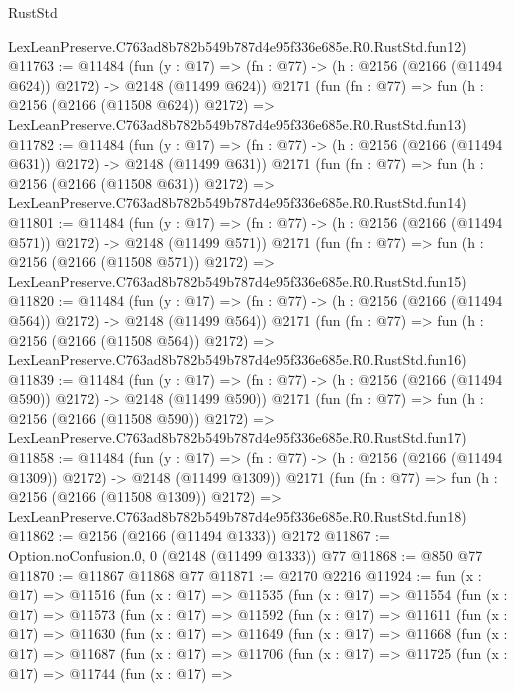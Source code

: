\begin{lexlean}{RustStd}
\begin{coremodule}
    LexLeanPreserve.C763ad8b782b549b787d4e95f336e685e.R0.RustStd.fun12)
@11763 := @11484
    (fun (y : @17) => (fn : @77) -> (h : @2156 (@2166 (@11494 @624)) @2172) -> @2148 (@11499 @624))
    @2171
    (fun (fn : @77) =>
    fun (h : @2156 (@2166 (@11508 @624)) @2172) =>
    LexLeanPreserve.C763ad8b782b549b787d4e95f336e685e.R0.RustStd.fun13)
@11782 := @11484
    (fun (y : @17) => (fn : @77) -> (h : @2156 (@2166 (@11494 @631)) @2172) -> @2148 (@11499 @631))
    @2171
    (fun (fn : @77) =>
    fun (h : @2156 (@2166 (@11508 @631)) @2172) =>
    LexLeanPreserve.C763ad8b782b549b787d4e95f336e685e.R0.RustStd.fun14)
@11801 := @11484
    (fun (y : @17) => (fn : @77) -> (h : @2156 (@2166 (@11494 @571)) @2172) -> @2148 (@11499 @571))
    @2171
    (fun (fn : @77) =>
    fun (h : @2156 (@2166 (@11508 @571)) @2172) =>
    LexLeanPreserve.C763ad8b782b549b787d4e95f336e685e.R0.RustStd.fun15)
@11820 := @11484
    (fun (y : @17) => (fn : @77) -> (h : @2156 (@2166 (@11494 @564)) @2172) -> @2148 (@11499 @564))
    @2171
    (fun (fn : @77) =>
    fun (h : @2156 (@2166 (@11508 @564)) @2172) =>
    LexLeanPreserve.C763ad8b782b549b787d4e95f336e685e.R0.RustStd.fun16)
@11839 := @11484
    (fun (y : @17) => (fn : @77) -> (h : @2156 (@2166 (@11494 @590)) @2172) -> @2148 (@11499 @590))
    @2171
    (fun (fn : @77) =>
    fun (h : @2156 (@2166 (@11508 @590)) @2172) =>
    LexLeanPreserve.C763ad8b782b549b787d4e95f336e685e.R0.RustStd.fun17)
@11858 := @11484
    (fun (y : @17) =>
    (fn : @77) -> (h : @2156 (@2166 (@11494 @1309)) @2172) -> @2148 (@11499 @1309))
    @2171
    (fun (fn : @77) =>
    fun (h : @2156 (@2166 (@11508 @1309)) @2172) =>
    LexLeanPreserve.C763ad8b782b549b787d4e95f336e685e.R0.RustStd.fun18)
@11862 := @2156 (@2166 (@11494 @1333)) @2172
@11867 := Option.noConfusion.{0, 0} (@2148 (@11499 @1333)) @77
@11868 := @850 @77
@11870 := @11867 @11868 @77
@11871 := @2170 @2216
@11924 := fun (x : @17) =>
  @11516
    (fun (x : @17) =>
    @11535
      (fun (x : @17) =>
      @11554
        (fun (x : @17) =>
        @11573
          (fun (x : @17) =>
          @11592
            (fun (x : @17) =>
            @11611
              (fun (x : @17) =>
              @11630
                (fun (x : @17) =>
                @11649
                  (fun (x : @17) =>
                  @11668
                    (fun (x : @17) =>
                    @11687
                      (fun (x : @17) =>
                      @11706
                        (fun (x : @17) =>
                        @11725
                          (fun (x : @17) =>
                          @11744
                            (fun (x : @17) =>

\end{coremodule}
\end{lexlean}
